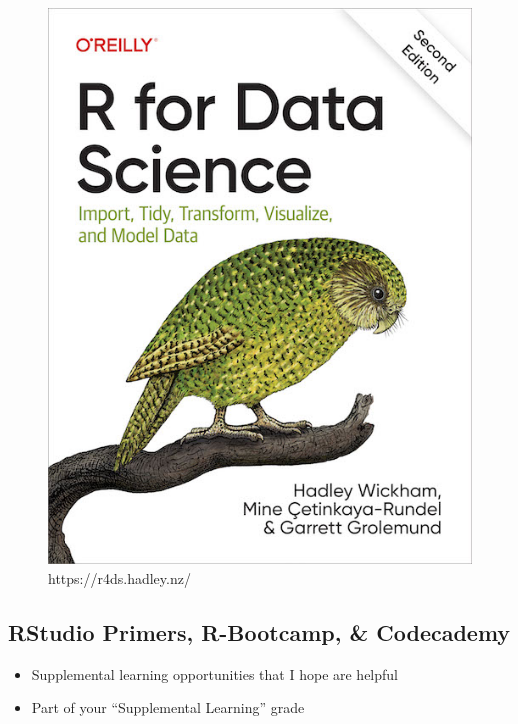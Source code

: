 \documentclass[
  letterpaper,
  DIV=11,
  numbers=noendperiod,
  oneside]{scrartcl}
\providecommand{\tightlist}{%
  \setlength{\itemsep}{0pt}\setlength{\parskip}{0pt}}\usepackage{longtable,booktabs,array}
\begin{document}
\begin{figure}

{\centering \includegraphics{w1_intro_files/mediabag/cover.jpg}

}

\caption{https://r4ds.hadley.nz/}

\end{figure}

\hypertarget{rstudio-primers-r-bootcamp-codecademy}{%
\subsection{RStudio Primers, R-Bootcamp, \&
Codecademy}\label{rstudio-primers-r-bootcamp-codecademy}}

\begin{itemize}
\tightlist
\item
  Supplemental learning opportunities that I hope are helpful
\item
  Part of your ``Supplemental Learning'' grade
\end{itemize}
\end{document}
